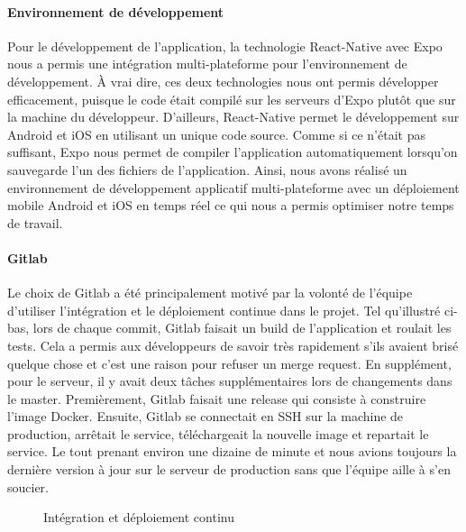         \paragraph{Environnement de développement}
        Pour le développement de l'application, la technologie React-Native avec Expo nous a permis une intégration multi-plateforme pour l'environnement de développement. À vrai dire, ces deux technologies nous ont permis développer efficacement, puisque le code était compilé sur les serveurs d'Expo plutôt que sur la machine du développeur. D'ailleurs, React-Native permet le développement sur Android et iOS en utilisant un unique code source. Comme si ce n'était pas suffisant, Expo nous permet de compiler l'application automatiquement lorsqu'on sauvegarde l'un des fichiers de l'application.  Ainsi, nous avons réalisé un environnement de développement applicatif multi-plateforme avec un déploiement mobile Android et iOS en temps réel ce qui nous a permis optimiser notre temps de travail.
        
        \paragraph{Gitlab}
        Le choix de Gitlab a été principalement motivé par la volonté de l'équipe d'utiliser l'intégration et le déploiement continue dans le projet. Tel qu'illustré ci-bas, lors de chaque commit, Gitlab faisait un build de l'application et roulait les tests. Cela a permis aux développeurs de savoir très rapidement s'ils avaient brisé quelque chose et c'est une raison pour refuser un merge request. En supplément, pour le serveur, il y avait deux tâches supplémentaires lors de changements dans le master. Premièrement, Gitlab faisait une release qui consiste à construire l'image Docker. Ensuite, Gitlab se connectait en SSH sur la machine de production, arrêtait le service, téléchargeait la nouvelle image et repartait le service. Le tout prenant environ une dizaine de minute et nous avions toujours la dernière version à jour sur le serveur de production sans que l'équipe aille à s'en soucier.
        
        \begin{figure}[hp] \centering
            
            \caption{Intégration et déploiement continu}
            \label{fig.gitlab}
        \end{figure}  
        
